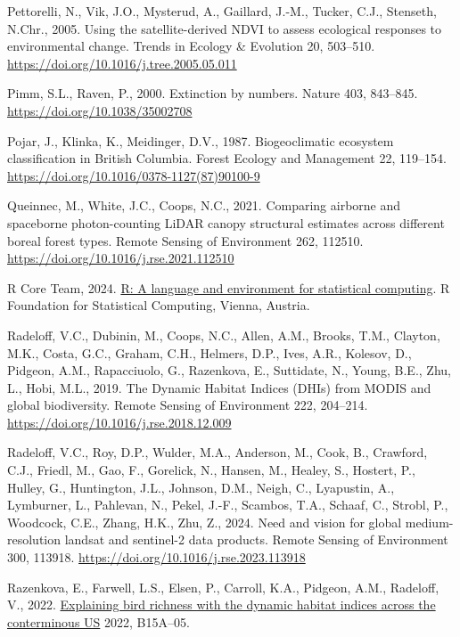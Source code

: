 \documentclass[
]{agujournal2019}
\newlength{\cslhangindent}
\newenvironment{CSLReferences}[2] %
 {\begin{list}{}{%
  \setlength{\itemindent}{0pt}
  \setlength{\leftmargin}{0pt}
  \setlength{\parsep}{0pt}
  \ifodd #1
   \setlength{\leftmargin}{\cslhangindent}
   \setlength{\itemindent}{-1\cslhangindent}
  \fi
  \setlength{\itemsep}{#2\baselineskip}}}
 {\end{list}}
\begin{document}
\begin{CSLReferences}{1}{0}
Pettorelli, N., Vik, J.O., Mysterud, A., Gaillard, J.-M., Tucker, C.J.,
Stenseth, N.Chr., 2005. Using the satellite-derived NDVI to assess
ecological responses to environmental change. Trends in Ecology \&
Evolution 20, 503--510. \url{https://doi.org/10.1016/j.tree.2005.05.011}

Pimm, S.L., Raven, P., 2000. Extinction by numbers. Nature 403,
843--845. \url{https://doi.org/10.1038/35002708}

Pojar, J., Klinka, K., Meidinger, D.V., 1987. Biogeoclimatic ecosystem
classification in British Columbia. Forest Ecology and Management 22,
119--154. \url{https://doi.org/10.1016/0378-1127(87)90100-9}

Queinnec, M., White, J.C., Coops, N.C., 2021. Comparing airborne and
spaceborne photon-counting LiDAR canopy structural estimates across
different boreal forest types. Remote Sensing of Environment 262,
112510. \url{https://doi.org/10.1016/j.rse.2021.112510}

R Core Team, 2024. \href{https://www.R-project.org/}{R: A language and
environment for statistical computing}. R Foundation for Statistical
Computing, Vienna, Austria.

Radeloff, V.C., Dubinin, M., Coops, N.C., Allen, A.M., Brooks, T.M.,
Clayton, M.K., Costa, G.C., Graham, C.H., Helmers, D.P., Ives, A.R.,
Kolesov, D., Pidgeon, A.M., Rapacciuolo, G., Razenkova, E., Suttidate,
N., Young, B.E., Zhu, L., Hobi, M.L., 2019. The Dynamic Habitat Indices
(DHIs) from MODIS and global biodiversity. Remote Sensing of Environment
222, 204--214. \url{https://doi.org/10.1016/j.rse.2018.12.009}

Radeloff, V.C., Roy, D.P., Wulder, M.A., Anderson, M., Cook, B.,
Crawford, C.J., Friedl, M., Gao, F., Gorelick, N., Hansen, M., Healey,
S., Hostert, P., Hulley, G., Huntington, J.L., Johnson, D.M., Neigh, C.,
Lyapustin, A., Lymburner, L., Pahlevan, N., Pekel, J.-F., Scambos, T.A.,
Schaaf, C., Strobl, P., Woodcock, C.E., Zhang, H.K., Zhu, Z., 2024. Need
and vision for global medium-resolution landsat and sentinel-2 data
products. Remote Sensing of Environment 300, 113918.
\url{https://doi.org/10.1016/j.rse.2023.113918}

Razenkova, E., Farwell, L.S., Elsen, P., Carroll, K.A., Pidgeon, A.M.,
Radeloff, V., 2022.
\href{https://ui.adsabs.harvard.edu/abs/2022AGUFM.B15A..05R}{Explaining
bird richness with the dynamic habitat indices across the conterminous
US} 2022, B15A--05.


\end{CSLReferences}
\end{document}
